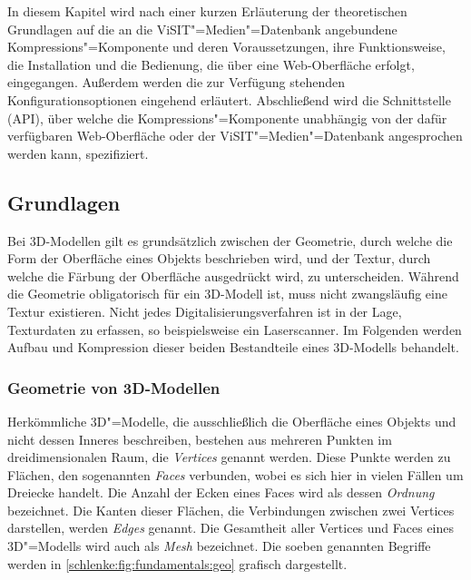 In diesem Kapitel wird nach einer kurzen Erläuterung der theoretischen Grundlagen auf die an die ViSIT"=Medien"=Datenbank angebundene Kompressions"=Komponente und deren Voraussetzungen, ihre Funktionsweise, die Installation und die Bedienung, die über eine Web-Oberfläche erfolgt, eingegangen. Außerdem werden die zur Verfügung stehenden Konfigurationsoptionen eingehend erläutert. Abschließend wird die Schnittstelle (API), über welche die Kompressions"=Komponente unabhängig von der dafür verfügbaren Web-Oberfläche oder der ViSIT"=Medien"=Datenbank angesprochen werden kann, spezifiziert.

\subsection{Grundlagen}

Bei 3D-Modellen gilt es grundsätzlich zwischen der Geometrie, durch welche die Form der Oberfläche eines Objekts beschrieben wird, und der Textur, durch welche die Färbung der Oberfläche ausgedrückt wird, zu unterscheiden. Während die Geometrie obligatorisch für ein 3D-Modell ist, muss nicht zwangsläufig eine Textur existieren. Nicht jedes Digitalisierungsverfahren ist in der Lage, Texturdaten zu erfassen, so beispielsweise ein Laserscanner. Im Folgenden werden Aufbau und Kompression dieser beiden Bestandteile eines 3D-Modells behandelt.

\subsubsection{Geometrie von 3D-Modellen}
\label{schlenke:chp:fundamentalsGeometry}

Herkömmliche 3D"=Modelle, die ausschließlich die Oberfläche eines Objekts und nicht dessen Inneres beschreiben, bestehen aus mehreren Punkten im dreidimensionalen Raum, die \emph{Vertices} genannt werden. Diese Punkte werden zu Flächen, den sogenannten \emph{Faces} verbunden, wobei es sich hier in vielen Fällen um Dreiecke handelt. Die Anzahl der Ecken eines Faces wird als dessen \emph{Ordnung} bezeichnet. Die Kanten dieser Flächen, die Verbindungen zwischen zwei Vertices darstellen, werden \emph{Edges} genannt. Die Gesamtheit aller Vertices und Faces eines 3D"=Modells wird auch als \emph{Mesh} bezeichnet. Die soeben genannten Begriffe werden in \autoref{schlenke:fig:fundamentals:geo} grafisch dargestellt.

